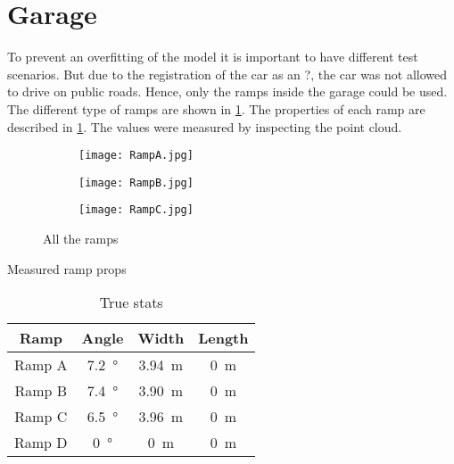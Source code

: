 \section{Garage}
\label{sec:garage}
To prevent an overfitting of the model it is important to have different test scenarios.
But due to the registration of the car as an ?, the car was not allowed to drive on public roads.
Hence, only the ramps inside the garage could be used.
The different type of ramps are shown in \cref{fig:all_ramps}.
The properties of each ramp are described in \cref{tab:ramp_properties}.
The values were measured by inspecting the point cloud.
\begin{figure}[htb]
	\begin{subfigure}{.3\linewidth}
		\centering
		\texttt{[image: RampA.jpg]}
		\caption{}
	\end{subfigure}
	\hfill
	\begin{subfigure}{.3\linewidth}
		\centering
		\texttt{[image: RampB.jpg]}
		\caption{}
	\end{subfigure}
	\hfill
	\begin{subfigure}{.3\linewidth}
		\centering
		\texttt{[image: RampC.jpg]}
		\caption{}
	\end{subfigure}
	\caption{All the ramps}
	\label{fig:all_ramps}
\end{figure}
Measured ramp props
\begin{table}[htb]
	\centering
	\caption{True stats}
	\label{tab:ramp_properties}
	\begin{tabular}[t]{cccc}
		\toprule
		\textbf{Ramp} & \textbf{Angle}    & \textbf{Width}    & \textbf{Length} \\
		\midrule
		Ramp A        & \SI{7.2}{\degree} & \SI{3.94}{\metre} & \SI{0}{\metre}  \\
		Ramp B        & \SI{7.4}{\degree} & \SI{3.90}{\metre} & \SI{0}{\metre}  \\
		Ramp C        & \SI{6.5}{\degree} & \SI{3.96}{\metre} & \SI{0}{\metre}  \\
		Ramp D        & \SI{0}{\degree}   & \SI{0}{\metre}    & \SI{0}{\metre}  \\
		\bottomrule
	\end{tabular}
\end{table}